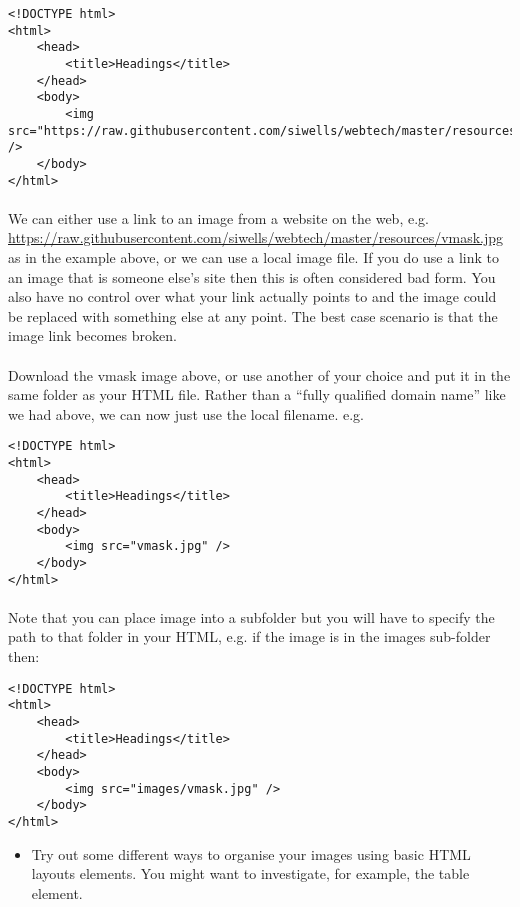\documentclass[10pt, a4paper]{article}
\begin{document}
\begin{lstlisting}
<!DOCTYPE html>
<html>
    <head>
        <title>Headings</title>
    </head>
    <body>
        <img src="https://raw.githubusercontent.com/siwells/webtech/master/resources/vmask.jpg" />      
    </body>
</html>
\end{lstlisting}

\paragraph{} We can either use a link to an image from a website on the web, e.g. \url{https://raw.githubusercontent.com/siwells/webtech/master/resources/vmask.jpg} as in the example above, or we can use a local image file. If you do use a link to an image that is someone else's site then this is often considered bad form. You also have no control over what your link actually points to and the image could be replaced with something else at any point. The best case scenario is that the image link becomes broken. 

\paragraph{} Download the vmask image above, or use another of your choice and put it in the same folder as your HTML file. Rather than a ``fully qualified domain name'' like we had above, we can now just use the local filename. e.g.

\begin{lstlisting}
<!DOCTYPE html>
<html>
    <head>
        <title>Headings</title>
    </head>
    <body>
        <img src="vmask.jpg" />      
    </body>
</html>
\end{lstlisting}

\paragraph{} Note that you can place image into a subfolder but you will have to specify the path to that folder in your HTML, e.g. if the image is in the images sub-folder then:

\begin{lstlisting}
<!DOCTYPE html>
<html>
    <head>
        <title>Headings</title>
    </head>
    <body>
        <img src="images/vmask.jpg" /> 
    </body>
</html>
\end{lstlisting}


\begin{itemize}
\item Try out some different ways to organise your images using basic HTML layouts elements. You might want to investigate, for example, the table element.
\end{itemize}
\end{document}
